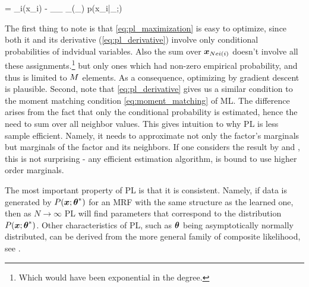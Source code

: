 \be
\label{eq:pl_derivative}
 =  \mub_i(x_i) - \sum_{\xx_{}} \mub_{}(\xx_{}) p(x_i|\xx_{};\thetav)
\ee

The first thing to note is that \eqref{eq:pl_maximization} is easy to optimize, since both it and its derivative (\eqref{eq:pl_derivative}) involve only conditional probabilities of indvidual variables. Also the sum over $\boldsymbol{x}_{Nei(i)}$ doesn't involve all these assignments.\footnote{Which would have been exponential in the degree.} but only ones which had non-zero empirical probability, and thus is limited to $M$ elements. 
As a consequence, optimizing by gradient descent is plausible.
Second, note that \eqref{eq:pl_derivative} gives us a similar condition to the moment matching condition \eqref{eq:moment_matching} of ML.
The difference arises from the fact that only the conditional probability is estimated, hence the need to sum over all neighbor values.
This gives intuition to why PL is less sample efficient. Namely, it needs to approximate not only the factor's marginals but marginals of the factor and its neighbors.
If one considers the result by \cite{bresler2014hardness} and \cite{montanari2015computational}, this is not surprising - any efficient estimation algorithm, is bound to use higher order marginals.

The most important property of PL is that it is consistent. Namely, if data is generated by $P(\boldsymbol{x};\boldsymbol{\theta}^*)$ for an MRF with the same structure as the learned one, then as $N\to\infty$ PL will find parameters that correspond to the distribution $P(\boldsymbol{x};\boldsymbol{\theta}^*)$.
Other characteristics of PL, such as $\boldsymbol{\theta}$ being asymptotically normally distributed, can be derived from the more general family of composite likelihood, see \cite{varin2011overview}.

